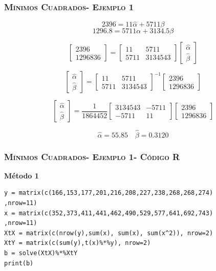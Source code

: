 \documentclass[16.5pt]{beamer}
\begin{document}
{
\begin{frame}
\frametitle{\textsc{Mínimos Cuadrados- Ejemplo 1}}
\hspace*{-5mm}
\vspace*{-5mm} 

$$ 2396 = 11\hat\alpha+ 5711 \beta$$
$$ 1296.8 = 5711\alpha + 3134.5 \beta$$

$$\begin{bmatrix} 2396 \\ 1296836     \end{bmatrix}= \begin{bmatrix} 11 & 5711 \\ 5711 & 3134543     \end{bmatrix}  \begin{bmatrix} \hat{\alpha} \\ \hat{\beta}      \end{bmatrix} $$

$$\begin{bmatrix} \hat{\alpha} \\ \hat{\beta}      \end{bmatrix}  = \begin{bmatrix} 11 & 5711 \\ 5711 & 3134543 \end{bmatrix}^{-1}\begin{bmatrix} 2396 \\ 1296836    \end{bmatrix} $$

$$\begin{bmatrix} \hat{\alpha} \\ \hat{\beta}      \end{bmatrix}  = \frac{1}{ 1864452} \begin{bmatrix} 3134543 &- 5711 \\ -5711 & 11     \end{bmatrix}\begin{bmatrix} 2396 \\ 1296836     \end{bmatrix} $$

$$\hat{\alpha} = 55.85    \quad  \hat{\beta}= 0.3120$$

\end{frame}
}

{
\begin{frame}
\frametitle{\textsc{Mínimos Cuadrados- Ejemplo 1- Código R}}

\textbf{Método 1}
\begin{lstlisting}
y = matrix(c(166,153,177,201,216,208,227,238,268,268,274)
,nrow=11)
x = matrix(c(352,373,411,441,462,490,529,577,641,692,743)
,nrow=11)
XtX = matrix(c(nrow(y),sum(x), sum(x), sum(x^2)), nrow=2)
XtY = matrix(c(sum(y),t(x)%*%y), nrow=2)
b = solve(XtX)%*%XtY
print(b)

\end{lstlisting}

\end{frame}
}
\end{document}
